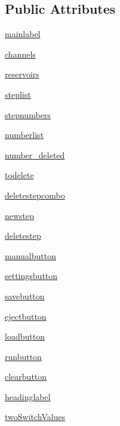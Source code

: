 \subsection*{Public Attributes}
\begin{DoxyCompactItemize}
\item 
\mbox{\hyperlink{classgui_1_1_automatic_page_a92671b6233d937a942a5f63471b8e13f}{mainlabel}}
\item 
\mbox{\hyperlink{classgui_1_1_automatic_page_a0527c3c09f8e591b8cb46ec926b23cf0}{channels}}
\item 
\mbox{\hyperlink{classgui_1_1_automatic_page_a637c9f8cc178c00046d28b3f6751b5ef}{reservoirs}}
\item 
\mbox{\hyperlink{classgui_1_1_automatic_page_a45447aadafb1a0fc69cfd2e66d903085}{steplist}}
\item 
\mbox{\hyperlink{classgui_1_1_automatic_page_a382658d2d981c27dfdcd701b4fd61d34}{stepnumbers}}
\item 
\mbox{\hyperlink{classgui_1_1_automatic_page_a208bec8e2ffcdf37665b930c1c00d888}{numberlist}}
\item 
\mbox{\hyperlink{classgui_1_1_automatic_page_a8445b7f6e0359f78a926e8a904bd2d59}{number\+\_\+deleted}}
\item 
\mbox{\hyperlink{classgui_1_1_automatic_page_a1c3c6e140390a3cb9b6f44fcd9b961ee}{todelete}}
\item 
\mbox{\hyperlink{classgui_1_1_automatic_page_adbd6a06b8f3bb3045e251ca7387086b1}{deletestepcombo}}
\item 
\mbox{\hyperlink{classgui_1_1_automatic_page_a356e4aa433a2fc1d033a3463632dc9fb}{newstep}}
\item 
\mbox{\hyperlink{classgui_1_1_automatic_page_accf2d93a890a03e34f11012b42be35fd}{deletestep}}
\item 
\mbox{\hyperlink{classgui_1_1_automatic_page_a1f481a3dfeb638586b9533edd15b60f4}{manualbutton}}
\item 
\mbox{\hyperlink{classgui_1_1_automatic_page_a4ae8c00d3af4de40854016545cf3d3bf}{settingsbutton}}
\item 
\mbox{\hyperlink{classgui_1_1_automatic_page_a4aa7ac1a1cf75d72da50dee8847b88a1}{savebutton}}
\item 
\mbox{\hyperlink{classgui_1_1_automatic_page_ae644dc324a898ee6b2b8ad9f190c5580}{ejectbutton}}
\item 
\mbox{\hyperlink{classgui_1_1_automatic_page_a287b322a26fb7f9f6e62dd4dc42a21b6}{loadbutton}}
\item 
\mbox{\hyperlink{classgui_1_1_automatic_page_a48b4201cf659773306d9a6af90358a25}{runbutton}}
\item 
\mbox{\hyperlink{classgui_1_1_automatic_page_a8885dcef638185ee30f6eb8b5bb25fef}{clearbutton}}
\item 
\mbox{\hyperlink{classgui_1_1_automatic_page_afb1fddb851ad736f8ea98c916b2b8773}{headinglabel}}
\item 
\mbox{\hyperlink{classgui_1_1_automatic_page_a2f2aa637bb0c955c9536b58dae6bed88}{two\+Switch\+Values}}
\end{DoxyCompactItemize}


